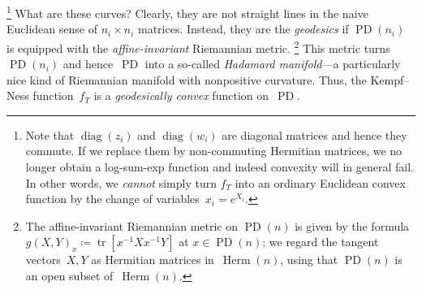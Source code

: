 \documentclass[11pt,letterpaper]{article}
\numberwithin{equation}{section}
\DeclareMathOperator{\PD}{PD}
\DeclareMathOperator{\diag}{diag}
\DeclareMathOperator{\tr}{tr}
\DeclareMathOperator{\Herm}{Herm}
\begin{document}
\footnote{Note that $\diag(z_i)$ and $\diag(w_i)$ are diagonal matrices and hence they commute.
If we replace them by non-commuting Hermitian matrices, we no longer obtain a log-sum-exp function and indeed convexity will in general fail.
In other words, we \emph{cannot} simply turn $f_T$ into an ordinary Euclidean convex function by the change of variables~$x_i = e^{X_i}$.}
What are these curves? Clearly, they are not straight lines in the naive Euclidean sense of $n_i\times n_i$ matrices.
Instead, they are the \emph{geodesics} if $\PD(n_i)$ is equipped with the \emph{affine-invariant} Riemannian metric.%
\footnote{The affine-invariant Riemannian metric on $\PD(n)$ is given by the formula $g(X,Y)_x \coloneqq \tr[x^{-1} X x^{-1} Y]$ at $x \in \PD(n)$; we regard the tangent vectors~$X,Y$ as Hermitian matrices in~$\Herm(n)$, using that $\PD(n)$ is an open subset of~$\Herm(n)$.}
This metric turns~$\PD(n_i)$ and hence~$\PD$ into a so-called \emph{Hadamard manifold}---a particularly nice kind of Riemannian manifold with nonpositive curvature.
Thus, the Kempf--Ness function~$f_T$ is a \emph{geodesically convex} function on~$\PD$.
\end{document}
